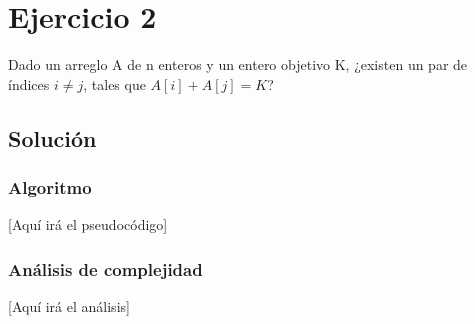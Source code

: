 \section{Ejercicio 2}
Dado un arreglo A de n enteros y un entero objetivo K, ¿existen un par de índices $i \neq j$, tales que $A[i] + A[j] = K$?

\subsection*{Solución}
\subsubsection*{Algoritmo}
[Aquí irá el pseudocódigo]

\subsubsection*{Análisis de complejidad}
[Aquí irá el análisis] 